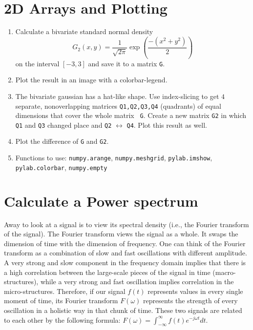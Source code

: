 \documentclass[smallheadings,12pt]{scrartcl}
\begin{document}
\section*{2D Arrays and Plotting}
\begin{enumerate}
\item Calculate a bivariate standard normal density
\[
G_2(x,y) = \frac{1}{\sqrt{2\pi}} \exp\left( \frac{-(x^2+y^2)}{2}\right)
\]
on the interval $[-3,3]$ and save it to a matrix {\tt G}.
\item Plot the result in an image with a colorbar-legend.
\item The bivariate gaussian has a hat-like shape. Use index-slicing
  to get $4$ separate, nonoverlapping matrices {\tt Q1,Q2,Q3,Q4}
  (quadrants) of equal dimensions that cover the whole matrix {\tt
    G}. Create a new matrix {\tt G2} in which {\tt Q1} and {\tt Q3}
  changed place and {\tt Q2} $\leftrightarrow$ {\tt Q4}. Plot this
  result as well.
\item Plot the difference of {\tt G} and {\tt G2}.
\item[] Functions to use: {\tt numpy.arange}, {\tt numpy.meshgrid}, 
  {\tt pylab.imshow}, {\tt pylab.colorbar}, {\tt numpy.empty}
\end{enumerate}

\section*{Calculate a Power spectrum }
Away to look at a signal is to view its spectral density (i.e., the Fourier transform of the signal). The Fourier transform views the signal as a whole. It swaps the dimension of time with the dimension of frequency. One can think of the Fourier transform as a combination of slow and fast oscillations with different amplitude. A very strong and slow component in the frequency domain implies that there is a high correlation between the large-scale pieces of the signal in time (macro-structures), while a very strong and fast oscillation implies correlation in the micro-structures. Therefore, if our signal $ f(t) $ represents values in every single moment of time, its Fourier transform $F(\omega)$ represents the strength of every oscillation in a holistic way in that chunk of time. These two signals are related to each other by the following formula:
$\displaystyle F(\omega) = \int_{-\infty}^{\infty} f(t){e}^{-j\omega t} dt.$ 
\end{document}
